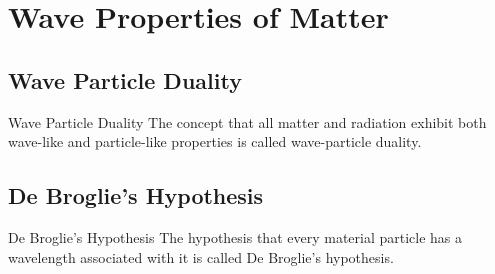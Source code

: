 \documentclass[12pt]{article}
\numberwithin{equation}{subsection}
\begin{document}

\section{Wave Properties of Matter}
\subsection{Wave Particle Duality}
\begin{definition}{Wave Particle Duality}{}
    The concept that all matter and radiation exhibit both wave-like and particle-like properties is called wave-particle duality.
\end{definition}

\subsection{De Broglie's Hypothesis}
\begin{definition}{De Broglie's Hypothesis}{}
    The hypothesis that every material particle has a wavelength associated with it is called De Broglie's hypothesis.
\end{definition}
\end{document}
